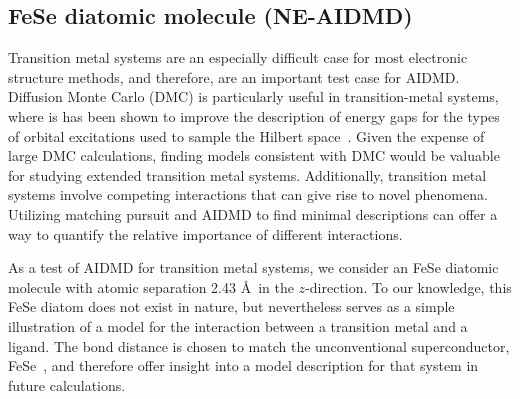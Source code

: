 \subsection{FeSe diatomic molecule (NE-AIDMD)}

Transition metal systems are an especially difficult case for most electronic structure methods, and therefore, are an 
important test case for AIDMD. 
Diffusion Monte Carlo (DMC) is particularly useful in transition-metal systems, where is has been shown to improve the description of energy gaps for the types of orbital excitations used to sample the Hilbert space~\cite{lucas}.
Given the expense of large DMC calculations, finding models consistent with DMC would be valuable for studying extended transition metal systems.
Additionally, transition metal systems involve competing interactions that can give rise to novel phenomena. 
Utilizing matching pursuit and AIDMD to find minimal descriptions can offer a way to quantify the relative importance of different interactions.

As a test of AIDMD for transition metal systems, we consider an FeSe diatomic molecule with atomic separation 2.43 \AA~in the $z$-direction.
To our knowledge, this FeSe diatom does not exist in nature, but nevertheless serves as a simple illustration of a model for the interaction between a transition metal and a ligand.
The bond distance is chosen to match the unconventional superconductor, FeSe~\cite{fese}, and therefore offer insight into a model description for that system in future calculations.

